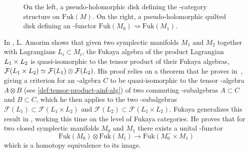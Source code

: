 \documentclass[JEP,XML,SOM,NoFloatCountersInSection,Unicode,published]{cedram}
\theoremstyle{definition}
\theoremstyle{plain}
\begin{document}
\begin{figure}[htb]
\begin{subfigure}{0.4\textwidth}

\end{subfigure}

\caption{On the left, a pseudo-holomorphic disk defining the \Ainf -category structure on $\mathrm{Fuk}(M)$. On the right, a pseudo-holomorphic quilted disk defining an \Ainf -functor $\mathrm{Fuk}(M_0)\rightsquigarrow\mathrm{Fuk}(M_1)$.} \label{fig:pseudo-hol-disk-bord-lagrang}
\end{figure}

In \cite{amorim-lagrangian}, L. Amorim shows that given two symplectic manifolds $M_1$ and $M_2$ together with Lagrangians $L_i \subset M_i$, the Fukaya algebra of the product Lagrangian $L_1 \times \nobreak L_2$ is quasi-isomorphic to the tensor product of their Fukaya algebras, \ie $\mathcal{F}(L_1 \times\nobreak L_2) \simeq \mathcal{F}(L_1) \otimes \mathcal{F}(L_2)$. His proof relies on a theorem that he proves in~\cite{amorim-tensor}, giving a criterion for an \Ainf -algebra $C$ to be quasi-isomorphic to the tensor \Ainf\nobreakdash-alge\-bra $A \otimes B$ (see \cref{def:tensor-product-ainf-alg}) of two commuting \Ainf -subalgebras $A \subset C$ and $B \subset C$, which he then applies to the two \Ainf -subalgebras $\mathcal{F}(L_1) \subset \mathcal{F}(L_1 \times L_2)$ and $\mathcal{F}(L_2) \subset \mathcal{F}(L_1 \times L_2)$.
Fukaya generalizes this result in \cite{fukaya-unobstructed}, working this time on the level of Fukaya categories. He proves that for two closed symplectic manifolds $M_0$ and $M_1$ there exists a unital \Ainf -functor
\[
\mathrm{Fuk}(M_0) \otimes \mathrm{Fuk}(M_1) \to \mathrm{Fuk}(M_0^- \times M_1)
\]
which is a homotopy equivalence to its image.
\end{document}
